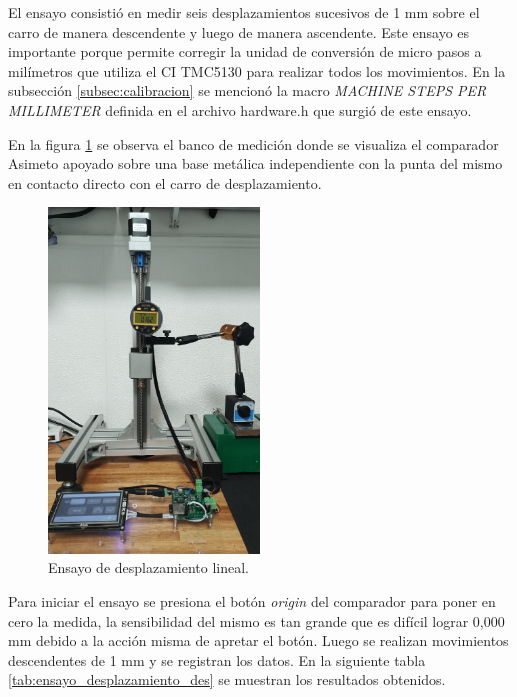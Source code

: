 El ensayo consistió en medir seis desplazamientos sucesivos de 1 mm sobre el carro de manera descendente y luego de manera ascendente. Este ensayo es importante porque permite corregir la unidad de conversión de micro pasos a milímetros que utiliza el CI TMC5130 para realizar todos los movimientos. 
En la subsección \ref{subsec:calibracion} se mencionó la macro \textit{MACHINE STEPS PER MILLIMETER} definida en el archivo hardware.h que surgió de este ensayo. 

En la figura \ref{fig:desplazamiento_lineal} se observa el banco de medición donde se visualiza el comparador Asimeto apoyado sobre una base metálica independiente con la punta del mismo en contacto directo con el carro de desplazamiento.

\begin{figure}[h]
\centering 
\includegraphics[width=0.5\textwidth]{./Figures/desplazamiento_lineal.png}
\caption{Ensayo de desplazamiento lineal.}
\label{fig:desplazamiento_lineal}
\end{figure}


Para iniciar el ensayo se presiona el botón \textit{origin} del comparador para poner en cero la medida, la sensibilidad del mismo es tan grande que es difícil lograr 0,000 mm debido a la acción misma  de apretar el botón. Luego se realizan movimientos descendentes de 1 mm y se registran los datos.
En la siguiente tabla \ref{tab:ensayo_desplazamiento_des} se muestran los resultados obtenidos.

